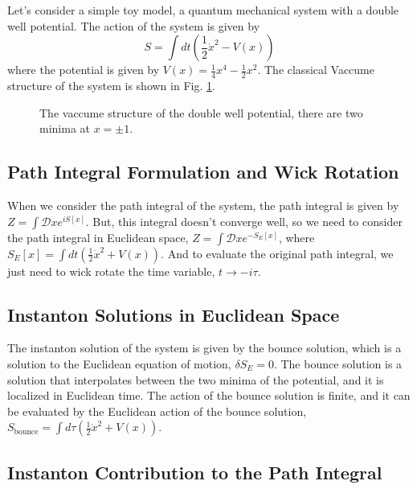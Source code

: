 \documentclass{article}
\begin{document}
Let's consider a simple toy model, a quantum mechanical system with a double well potential. The action of the system is given by
\begin{equation}
    S = \int dt \left( \frac{1}{2} \dot{x}^2 - V(x) \right)
\end{equation}
where the potential is given by $V(x) = \frac{1}{4}x^4 - \frac{1}{2}x^2$.
The classical Vaccume structure of the system is shown in Fig. \ref{fig:doublewell}.
\begin{figure}[h]
    \centering
    \caption{The vaccume structure of the double well potential, there are two minima at $x = \pm 1$.}
    \label{fig:doublewell}
\end{figure}




\subsection{Path Integral Formulation and Wick Rotation}


When we consider the path integral of the system, the path integral is given by $Z = \int \mathcal{D}x e^{iS[x]}$.
But, this integral doesn't converge well, so we need to consider the path integral in Euclidean space, $Z = \int \mathcal{D}x e^{-S_E[x]}$, where $S_E[x] = \int dt \left( \frac{1}{2} \dot{x}^2 + V(x) \right)$.
And to evaluate the original path integral, we just need to wick rotate the time variable, $t \rightarrow -i\tau$.


\subsection{Instanton Solutions in Euclidean Space}


The instanton solution of the system is given by the bounce solution, which is a solution to the Euclidean equation of motion, $\delta S_E = 0$.
The bounce solution is a solution that interpolates between the two minima of the potential, and it is localized in Euclidean time.
The action of the bounce solution is finite, and it can be evaluated by the Euclidean action of the bounce solution, $S_{\text{bounce}} = \int d\tau \left( \frac{1}{2} \dot{x}^2 + V(x) \right)$.




\subsection{Instanton Contribution to the Path Integral}
\end{document}
